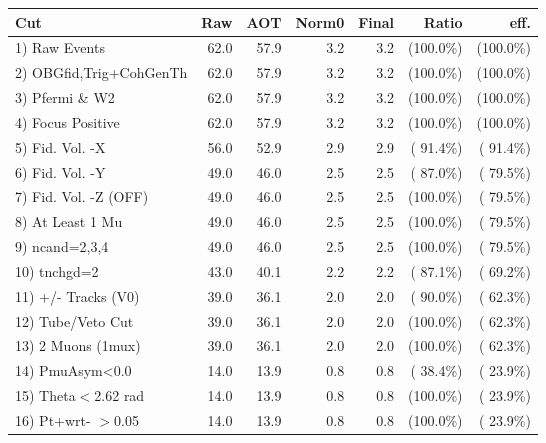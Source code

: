 \begin{table}[h!]\centering
 \begin{tabular}{||l||r|r|r|r|r|r||}
 \hline
 \hline
 Cut & Raw & AOT & Norm0 & Final & Ratio & eff.       \\
 \hline
  1) Raw Events           &         62.0 &         57.9 &          3.2 &          3.2 & (100.0\%) & (100.0\%) \\
  2) OBGfid,Trig+CohGenTh &         62.0 &         57.9 &          3.2 &          3.2 & (100.0\%) & (100.0\%) \\
  3) Pfermi \& W2         &         62.0 &         57.9 &          3.2 &          3.2 & (100.0\%) & (100.0\%) \\
  4) Focus Positive       &         62.0 &         57.9 &          3.2 &          3.2 & (100.0\%) & (100.0\%) \\
  5) Fid. Vol. -X         &         56.0 &         52.9 &          2.9 &          2.9 & ( 91.4\%) & ( 91.4\%) \\
  6) Fid. Vol. -Y         &         49.0 &         46.0 &          2.5 &          2.5 & ( 87.0\%) & ( 79.5\%) \\
  7) Fid. Vol. -Z (OFF)   &         49.0 &         46.0 &          2.5 &          2.5 & (100.0\%) & ( 79.5\%) \\
  8) At Least 1 Mu        &         49.0 &         46.0 &          2.5 &          2.5 & (100.0\%) & ( 79.5\%) \\
  9) ncand=2,3,4          &         49.0 &         46.0 &          2.5 &          2.5 & (100.0\%) & ( 79.5\%) \\
 10) tnchgd=2             &         43.0 &         40.1 &          2.2 &          2.2 & ( 87.1\%) & ( 69.2\%) \\
 11) +/- Tracks (V0)      &         39.0 &         36.1 &          2.0 &          2.0 & ( 90.0\%) & ( 62.3\%) \\
 12) Tube/Veto Cut        &         39.0 &         36.1 &          2.0 &          2.0 & (100.0\%) & ( 62.3\%) \\
 13) 2 Muons (1mux)       &         39.0 &         36.1 &          2.0 &          2.0 & (100.0\%) & ( 62.3\%) \\
 14) PmuAsym<0.0          &         14.0 &         13.9 &          0.8 &          0.8 & ( 38.4\%) & ( 23.9\%) \\
 15) Theta$<$2.62 rad     &         14.0 &         13.9 &          0.8 &          0.8 & (100.0\%) & ( 23.9\%) \\
 16) Pt+wrt- $>$0.05      &         14.0 &         13.9 &          0.8 &          0.8 & (100.0\%) & ( 23.9\%) \\

\end{tabular}
\end{table}
